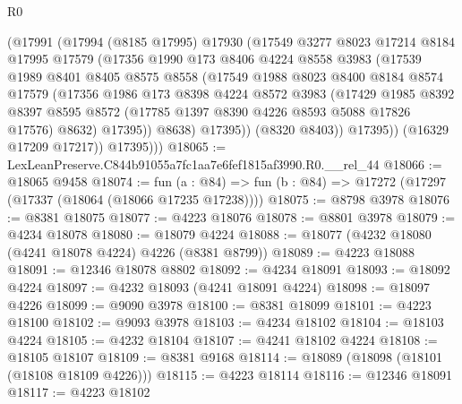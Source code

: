 \begin{lexlean}{R0}
\begin{coremodule}
              (@17991
                (@17994
                  (@8185 @17995)
                  @17930
                  (@17549
                    @3277
                    @8023
                    @17214
                    @8184
                    @17995
                    @17579
                    (@17356
                      @1990
                      @173
                      @8406
                      @4224
                      @8558
                      @3983
                      (@17539
                        @1989
                        @8401
                        @8405
                        @8575
                        @8558
                        (@17549
                          @1988
                          @8023
                          @8400
                          @8184
                          @8574
                          @17579
                          (@17356
                            @1986
                            @173
                            @8398
                            @4224
                            @8572
                            @3983
                            (@17429
                              @1985
                              @8392
                              @8397
                              @8595
                              @8572
                              (@17785 @1397 @8390 @4226 @8593 @5088 @17826 @17576)
                              @8632)
                            @17395))
                        @8638)
                      @17395))
                  (@8320 @8403))
                @17395))
            (@16329 @17209 @17217))
          @17395)))
@18065 := LexLeanPreserve.C844b91055a7fc1aa7e6fef1815af3990.R0.__rel_44
@18066 := @18065 @9458
@18074 := fun (a : @84) => fun (b : @84) => @17272 (@17297 (@17337 (@18064 (@18066 @17235 @17238))))
@18075 := @8798 @3978
@18076 := @8381 @18075
@18077 := @4223 @18076
@18078 := @8801 @3978
@18079 := @4234 @18078
@18080 := @18079 @4224
@18088 := @18077 (@4232 @18080 (@4241 @18078 @4224) @4226 (@8381 @8799))
@18089 := @4223 @18088
@18091 := @12346 @18078 @8802
@18092 := @4234 @18091
@18093 := @18092 @4224
@18097 := @4232 @18093 (@4241 @18091 @4224)
@18098 := @18097 @4226
@18099 := @9090 @3978
@18100 := @8381 @18099
@18101 := @4223 @18100
@18102 := @9093 @3978
@18103 := @4234 @18102
@18104 := @18103 @4224
@18105 := @4232 @18104
@18107 := @4241 @18102 @4224
@18108 := @18105 @18107
@18109 := @8381 @9168
@18114 := @18089 (@18098 (@18101 (@18108 @18109 @4226)))
@18115 := @4223 @18114
@18116 := @12346 @18091
@18117 := @4223 @18102

\end{coremodule}
\end{lexlean}
